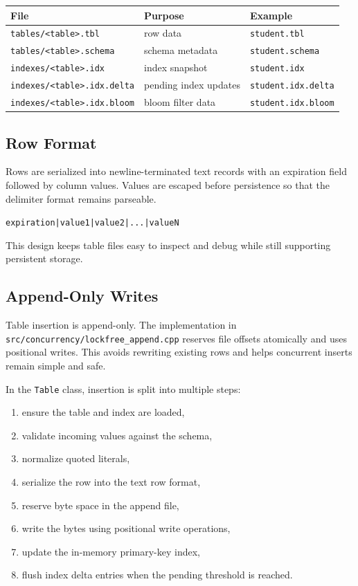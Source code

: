 \documentclass[12pt,a4paper]{article}
\begin{document}
\begin{center}
\renewcommand{\arraystretch}{1.3}
\begin{tabular}{lll}
\toprule
File & Purpose & Example \\
\midrule
\texttt{tables/<table>.tbl} & row data & \texttt{student.tbl} \\
\texttt{tables/<table>.schema} & schema metadata & \texttt{student.schema} \\
\texttt{indexes/<table>.idx} & index snapshot & \texttt{student.idx} \\
\texttt{indexes/<table>.idx.delta} & pending index updates & \texttt{student.idx.delta} \\
\texttt{indexes/<table>.idx.bloom} & bloom filter data & \texttt{student.idx.bloom} \\
\bottomrule
\end{tabular}
\end{center}

\subsection{Row Format}

Rows are serialized into newline-terminated text records with an expiration
field followed by column values. Values are escaped before persistence so that
the delimiter format remains parseable.

\begin{center}
\texttt{expiration|value1|value2|...|valueN}
\end{center}

This design keeps table files easy to inspect and debug while still supporting
persistent storage.

\subsection{Append-Only Writes}

Table insertion is append-only. The implementation in
\texttt{src/concurrency/lockfree\_append.cpp} reserves file offsets
atomically and uses positional writes. This avoids rewriting existing rows and
helps concurrent inserts remain simple and safe.

In the \texttt{Table} class, insertion is split into multiple steps:

\begin{enumerate}[leftmargin=1.8em]
  \item ensure the table and index are loaded,
  \item validate incoming values against the schema,
  \item normalize quoted literals,
  \item serialize the row into the text row format,
  \item reserve byte space in the append file,
  \item write the bytes using positional write operations,
  \item update the in-memory primary-key index,
  \item flush index delta entries when the pending threshold is reached.
\end{enumerate}
\end{document}
